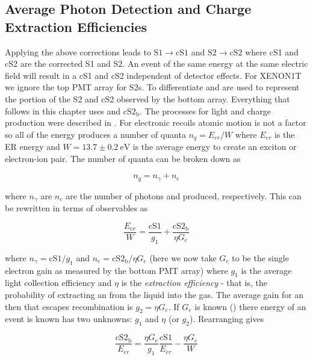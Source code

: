 {\subsection{Average Photon Detection and Charge Extraction Efficiencies}
\label{subsec:det_char_photon_charge_efficiencies}
Applying the above corrections leads to $\mathrm{S1} \rightarrow \mathrm{cS1}$ and $\mathrm{S2} \rightarrow \mathrm{cS2}$ where cS1 and
cS2 are the corrected S1 and S2.  An event of the same energy at the same electric field will result in a cS1 and cS2 independent of
detector effects.  For XENON1T we ignore the top PMT array for S2s.  To differentiate \stwob and \cstwob are used to represent the portion
of the S2 and cS2 observed by the bottom array.  Everything that follows in this chapter uses \stwob and $\mathrm{cS2_b}$.  The processes
for light and charge production were described in .  For electronic recoils atomic motion is
not a factor so all of the energy produces a number of quanta $n_q = E_{er} / W$ where $E_{er}$ is the ER energy and
$W = 13.7 \pm 0.2\ \mathrm{eV}$ is the average energy to create an exciton or electron-ion pair.  The number of quanta can be broken
down as

\begin{equation}
n_q = n_{\gamma} + n_e
\end{equation}

\noindent where $n_{\gamma}$ are $n_e$ are the number of photons and \electron produced, respectively.  This can be rewritten in terms of
observables as

\begin{equation}
\frac{E_{er}}{W} = \frac{\mathrm{cS1}}{g_1} + \frac{\mathrm{cS2_b}}{\eta G_e}
\label{eq:calibrations_s1_s2}
\end{equation}

\noindent where $n_{\gamma} = \mathrm{cS1} / g_1$ and $n_e = \mathrm{cS2_b} / \eta G_e$ (here we now take $G_e$ to be the single electron
gain as measured by the bottom PMT array) where $g_1$ is the average light collection
efficiency and $\eta$
is the \textit{extraction efficiency} - that is, the probability of extracting an \electron from the liquid into the gas.  The average
gain for an \electron then that escapes recombination is $g_2 = \eta G_e$.  If $G_e$ is known
() there energy of an event is known  has two unknowns:
$g_1$ and $\eta$ (or $g_2$).  Rearranging gives

\begin{equation}
\frac{\mathrm{cS2_b}}{E_{er}} = \frac{\eta G_e}{g_1} \frac{\mathrm{cS1}}{E_{er}} - \frac{\eta G_e}{W}
\end{equation}

}
